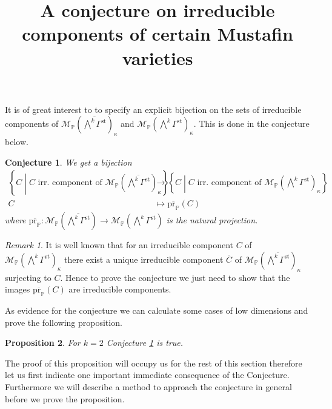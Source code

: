 \documentclass[11pt,a4paper]{amsart}
\title{A conjecture on irreducible components of certain Mustafin varieties}
\newtheorem{prop}{Proposition}[section]
\newtheorem{conj}{Conjecture}[section]
\theoremstyle{definition}
\theoremstyle{remark}
\newtheorem{rem}[prop]{Remark}
\newcommand{\Projsp}{\mathbb{P}}
\newcommand{\res}{\kappa}
\newcommand{\M}[1]{\mathcal{M}_{\Projsp}\left(#1\right)}
\newcommand{\projbar}{\mathrm{\overline{\pr_{\Projsp}}}}
\newcommand{\pr}{\mathrm{pr}}
\begin{document}
\maketitle
It is of great interest to to specify an explicit bijection on the sets of irreducible components of $\M{\overline{\bigwedge^k\Gamma^{\mathrm{st}}}}_{\res}$ and $\M{{\bigwedge^k\Gamma^{\mathrm{st}}}}_{\res}$. This is done in the conjecture below.  
  

\begin{conj}
\label{conj_convexcl_bijection}
	We get a bijection
	\begin{align*}
		\left\{C\middle\vert C \text{ irr. component of } \M{\overline{\bigwedge^k\Gamma^{\mathrm{st}}}}_{\res} \right\}&\longrightarrow \left\{C\middle\vert C \text{ irr. component of } \M{\bigwedge^k\Gamma^{\mathrm{st}}}_{\res} \right\}\\
		C & \longmapsto \projbar (C) 
	\end{align*}
	where $\projbar\colon \M{\overline{\bigwedge^k\Gamma^{\mathrm{st}}}}\rightarrow \M{\bigwedge^k\Gamma^{\mathrm{st}}}$ is the natural projection.
\end{conj}

\begin{rem}
	It is well known that for an irreducible component $C$ of $\M{\bigwedge^k\Gamma^{\mathrm{st}}}_{\res}$ there exist a unique irreducible component $\overline{C}$ of $\M{\overline{\bigwedge^k\Gamma^{\mathrm{st}}}}_{\res}$ surjecting to $C$. Hence to prove the conjecture we just need to show that the images $\projbar (C)$ are irreducible components.
\end{rem}

As evidence for the conjecture we can calculate some cases of low dimensions and prove the following proposition. 

\begin{prop}
\label{prop_conj_k_2}
	For $k=2$ Conjecture \ref{conj_convexcl_bijection} is true.
\end{prop}

The proof of this proposition will occupy us for the rest of this section therefore let us first indicate one important immediate consequence of the Conjecture. Furthermore we will describe a method to approach the conjecture in general before we prove the proposition.
\end{document}
